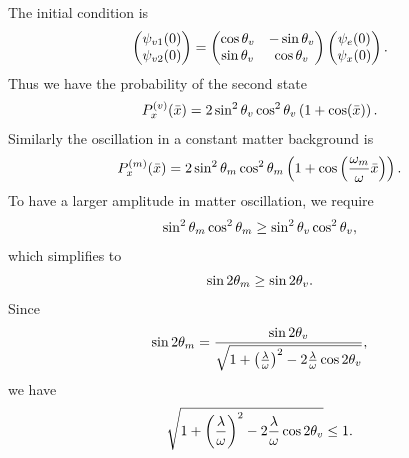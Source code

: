 \documentclass[letterpaper,12pt,english]{sphinxmanual}
\begin{document}
The initial condition is
\begin{gather}
\begin{split}\begin{pmatrix} \psi_{v1}(0) \\ \psi_{v2}(0) \end{pmatrix} = \begin{pmatrix} \cos\theta_v & -\sin\theta_v \\ \sin \theta_v & \cos\theta_v \end{pmatrix} \begin{pmatrix} \psi_{e}(0) \\ \psi_{x}(0) \end{pmatrix} .\end{split}\notag
\end{gather}
Thus we have the probability of the second state
\begin{gather}
\begin{split}P_{x}^{(v)}(\bar x) = 2\sin^2\theta_v \cos^2\theta_v \left( 1 + \cos (\bar x) \right).\end{split}\notag
\end{gather}
Similarly the oscillation in a constant matter background is
\begin{gather}
\begin{split}P_{x}^{(m)}(\bar x) = 2\sin^2\theta_m \cos^2\theta_m \left( 1 + \cos \left( \frac{\omega_m}{\omega} \bar x \right) \right).\end{split}\notag
\end{gather}
To have a larger amplitude in matter oscillation, we require
\begin{gather}
\begin{split}\sin ^2\theta_m \cos^2\theta_m \geq \sin ^2\theta_v \cos^2\theta_v,\end{split}\notag
\end{gather}
which simplifies to
\begin{gather}
\begin{split}\sin 2\theta_m \geq \sin 2\theta_v.\end{split}\notag
\end{gather}
Since
\begin{gather}
\begin{split}\sin 2\theta_m = \frac{\sin 2\theta_v}{\sqrt{ 1 + \left(\frac{\lambda}{\omega}\right)^2 - 2\frac{\lambda}{\omega} \cos 2\theta_v }},\end{split}\notag
\end{gather}
we have
\begin{gather}
\begin{split}\sqrt{ 1 + \left(\frac{\lambda}{\omega}\right)^2 - 2\frac{\lambda}{\omega} \cos 2\theta_v } \leq 1.\end{split}\notag
\end{gather}
\end{document}
